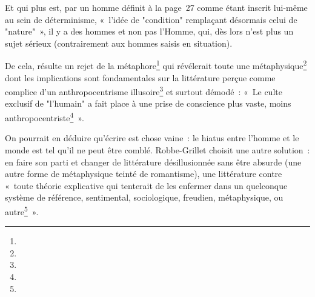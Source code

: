 \documentclass[12pt, a4paper]{article}
\begin{document}
Et qui plus est, par un homme définit à la page~27 comme étant inscrit lui-même au sein de déterminisme, «~l'idée de "condition" remplaçant désormais celui de "nature"~», il y a des hommes et non pas l'Homme, qui, dès lors n'est plus un sujet sérieux (contrairement aux hommes saisis en situation).

De cela, résulte un rejet de la métaphore\footnote{} qui révélerait toute une métaphysique\footnote{} dont les implications sont fondamentales sur la littérature perçue comme complice d'un anthropocentrisme illusoire\footnote{} et surtout démodé~: «~Le culte exclusif de "l'humain" a fait place à une prise de conscience plus vaste, moins anthropocentriste\footnote{}~».


On pourrait en déduire qu'écrire est chose vaine~: le hiatus entre l'homme et le monde est tel qu'il ne peut être comblé. Robbe-Grillet choisit une autre solution~: en faire son parti et changer de littérature désillusionnée sans être absurde (une autre forme de métaphysique teinté de romantisme), une littérature contre «~toute théorie explicative qui tenterait de les enfermer dans un quelconque système de référence, sentimental, sociologique, freudien, métaphysique, ou autre\footnote{}~».
\end{document}
